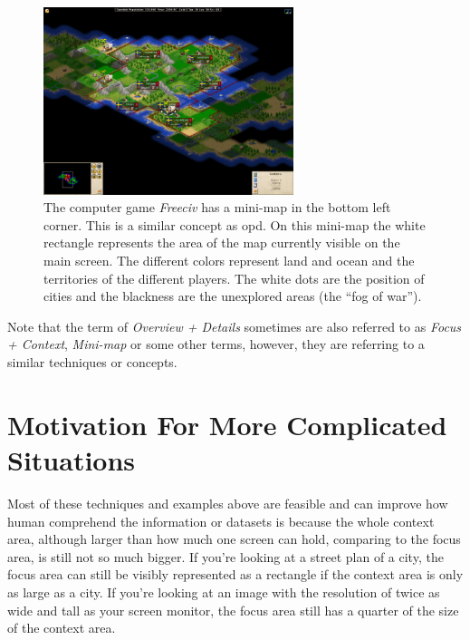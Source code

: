 \begin{figure}[th]
\centering
\includegraphics[width=0.65\textwidth,keepaspectratio]{Figures/Chapter1/minimap.png}
\decoRule
\caption[Overview Plus Details In Computer Games]{The computer game \emph{Freeciv} has a mini-map in the bottom left corner. This is a similar concept as \gls{opd}. On this mini-map the white rectangle represents the area of the map currently visible on the main screen. The different colors represent land and ocean and the territories of the different players. The white dots are the position of cities and the blackness are the unexplored areas (the ``fog of war'')\cite{wiki:minimap}.}
\label{fig:minimap}
\end{figure}

Note that the term of \emph{Overview + Details} sometimes are also referred to as \emph{Focus + Context}, \emph{Mini-map} or some other terms, however, they are referring to a similar techniques or concepts. 


\section{Motivation For More Complicated Situations}

Most of these techniques and examples above are feasible and can improve how human comprehend the information or datasets is because the whole context area, although larger than how much one screen can hold, comparing to the focus area, is still not so much bigger. If you're looking at a street plan of a city, the focus area can still be visibly represented as a rectangle if the context area is only as large as a city. If you're looking at an image with the resolution of twice as wide and tall as your screen monitor, the focus area still has a quarter of the size of the context area.

